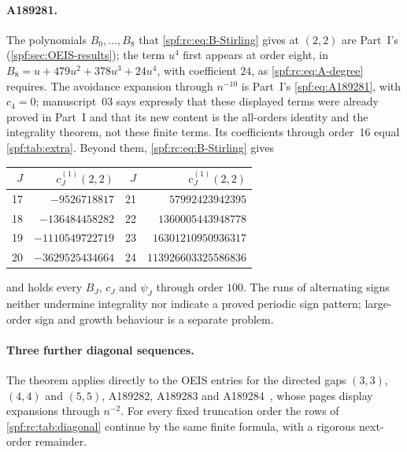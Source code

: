 \documentclass[11pt]{article}
\numberwithin{equation}{section}
\theoremstyle{definition}
\theoremstyle{remark}
\theoremstyle{definition}
\begin{document}
\paragraph{A189281.} The polynomials $B_0,\ldots,B_8$ that
\eqref{spf:rc:eq:B-Stirling} gives at $(2,2)$ are Part~I's
(\cref{spf:sec:OEIS-results}); the term $u^4$ first appears at order eight,
in $B_8=u+479u^2+378u^3+24u^4$, with coefficient $24$, as
\eqref{spf:rc:eq:A-degree} requires. The avoidance expansion through
$n^{-10}$ is Part~I's \eqref{spf:eq:A189281}, with $c_4=0$; manuscript~03
says expressly that these displayed terms were already proved in Part~I and
that its new content is the all-orders identity and the integrality theorem,
not these finite terms. Its coefficients through order~16 equal
\cref{spf:tab:extra}. Beyond them, \eqref{spf:rc:eq:B-Stirling} gives
\begin{center}
\small
\renewcommand{\arraystretch}{1.14}
\begin{tabular}{rr@{\qquad}rr}
\toprule
$J$ & $c_J^{(1)}(2,2)$ & $J$ & $c_J^{(1)}(2,2)$\\
\midrule
17 & $-9526718817$ & 21 & $57992423942395$\\
18 & $-136484458282$ & 22 & $1360005443948778$\\
19 & $-1110549722719$ & 23 & $16301210950936317$\\
20 & $-3629525434664$ & 24 & $113926603325586836$\\
\bottomrule
\end{tabular}
\end{center}
and  holds every $B_J$,
$c_J$ and $\psi_J$ through order $100$. The runs of alternating signs neither
undermine integrality nor indicate a proved periodic sign pattern; large-order
sign and growth behaviour is a separate problem.

\paragraph{Three further diagonal sequences.} The theorem applies directly
to the OEIS entries for the directed gaps $(3,3)$, $(4,4)$ and $(5,5)$,
A189282, A189283 and A189284~\cite{rcOeis282,rcOeis283,rcOeis284}, whose
pages display expansions through $n^{-2}$. For every fixed truncation order
the rows of \cref{spf:rc:tab:diagonal} continue by the same finite formula,
with a rigorous next-order remainder.
\end{document}
